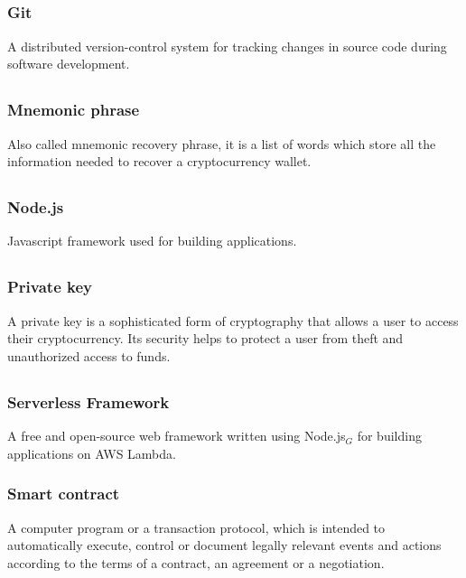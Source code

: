 	\subsection*{}
		\subsubsection*{Git}
			A distributed version-control system for tracking changes in source code during software development.
			
	\subsection*{}
		\subsubsection*{Mnemonic phrase}
			Also called mnemonic recovery phrase, it is a list of words which store all the information needed to recover a cryptocurrency wallet.
	
	\subsection*{}
		\subsubsection*{Node.js}
			Javascript framework used for building applications. 
	
	\subsection*{}
		\subsubsection*{Private key}
			A private key is a sophisticated form of cryptography that allows a user to access their cryptocurrency. Its security helps to protect a user from theft and unauthorized access to funds.
	
	\subsection*{}
		\subsubsection*{Serverless Framework}
			A free and open-source web framework written using Node.js$_{G}$ for building applications on AWS Lambda.
			
		\subsubsection*{Smart contract}
			A computer program or a transaction protocol, which is intended to automatically execute, control or document legally relevant events and actions according to the terms of a contract, an agreement or a negotiation.
